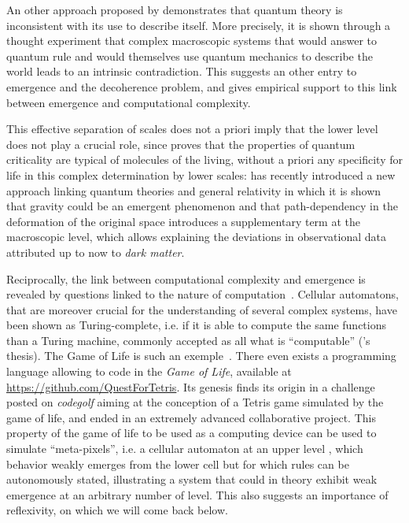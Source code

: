An other approach proposed by \cite{frauchiger2018quantum} demonstrates that quantum theory is inconsistent with its use to describe itself. More precisely, it is shown through a thought experiment that complex macroscopic systems that would answer to quantum rule and would themselves use quantum mechanics to describe the world leads to an intrinsic contradiction. This suggests an other entry to emergence and the decoherence problem, and gives empirical support to this link between emergence and computational complexity.


This effective separation of scales does not a priori imply that the lower level does not play a crucial role, since \cite{vattay2015quantum} proves that the properties of quantum criticality are typical of molecules of the living, without a priori any specificity for life in this complex determination by lower scales: \cite{2016arXiv161102269V} has recently introduced a new approach linking quantum theories and general relativity in which it is shown that gravity could be an emergent phenomenon and that path-dependency in the deformation of the original space introduces a supplementary term at the macroscopic level, which allows explaining the deviations in observational data attributed up to now to \emph{dark matter}.




Reciprocally, the link between computational complexity and emergence is revealed by questions linked to the nature of computation~\cite{moore2011nature}. Cellular automatons, that are moreover crucial for the understanding of several complex systems, have been shown as Turing-complete, i.e. if it is able to compute the same functions than a Turing machine, commonly accepted as all what is ``computable'' ('s thesis). The Game of Life is such an exemple~\cite{beer2004autopoiesis}. There even exists a programming language allowing to code in the \emph{Game of Life}, available at \url{https://github.com/QuestForTetris}. Its genesis finds its origin in a challenge posted on \emph{codegolf} aiming at the conception of a Tetris game simulated by the game of life, and ended in an extremely advanced collaborative project. This property of the game of life to be used as a computing device can be used to simulate ``meta-pixels'', i.e. a cellular automaton at an upper level \cite{todesco2013cellular}, which behavior weakly emerges from the lower cell but for which rules can be autonomously stated, illustrating a system that could in theory exhibit weak emergence at an arbitrary number of level. This also suggests an importance of reflexivity, on which we will come back below.


